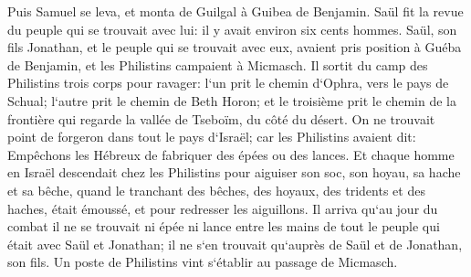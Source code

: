 \verse Puis Samuel se leva, et monta de Guilgal à Guibea de Benjamin. Saül fit la revue du peuple qui se trouvait avec lui: il y avait environ six cents hommes. 
\verse Saül, son fils Jonathan, et le peuple qui se trouvait avec eux, avaient pris position à Guéba de Benjamin, et les Philistins campaient à Micmasch. 
\verse Il sortit du camp des Philistins trois corps pour ravager: l`un prit le chemin d`Ophra, vers le pays de Schual; 
\verse l`autre prit le chemin de Beth Horon; et le troisième prit le chemin de la frontière qui regarde la vallée de Tseboïm, du côté du désert. 
\verse On ne trouvait point de forgeron dans tout le pays d`Israël; car les Philistins avaient dit: Empêchons les Hébreux de fabriquer des épées ou des lances. 
\verse Et chaque homme en Israël descendait chez les Philistins pour aiguiser son soc, son hoyau, sa hache et sa bêche, 
\verse quand le tranchant des bêches, des hoyaux, des tridents et des haches, était émoussé, et pour redresser les aiguillons. 
\verse Il arriva qu`au jour du combat il ne se trouvait ni épée ni lance entre les mains de tout le peuple qui était avec Saül et Jonathan; il ne s`en trouvait qu`auprès de Saül et de Jonathan, son fils. 
\verse Un poste de Philistins vint s`établir au passage de Micmasch. 

